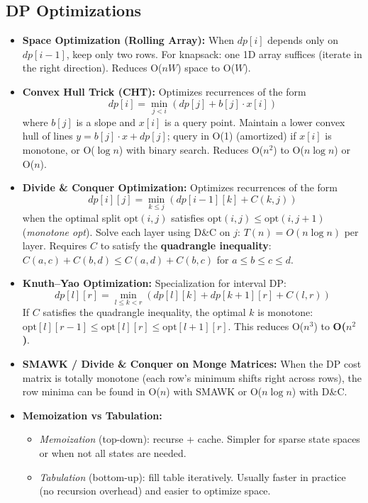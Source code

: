 \subsection{DP Optimizations}

\begin{itemize}
    \item \textbf{Space Optimization (Rolling Array):} When $dp[i]$ depends only on $dp[i-1]$, keep only two rows. For knapsack: one 1D array suffices (iterate in the right direction). Reduces O($nW$) space to O($W$).

    \item \textbf{Convex Hull Trick (CHT):} Optimizes recurrences of the form
          \[ dp[i] = \min_{j < i}\!\left(dp[j] + b[j] \cdot x[i]\right) \]
          where $b[j]$ is a slope and $x[i]$ is a query point. Maintain a lower convex hull of lines $y = b[j] \cdot x + dp[j]$; query in O(1) (amortized) if $x[i]$ is monotone, or O($\log n$) with binary search. Reduces O($n^2$) to O($n \log n$) or O($n$).

    \item \textbf{Divide \& Conquer Optimization:} Optimizes recurrences of the form
          \[ dp[i][j] = \min_{k \leq j}\!\left(dp[i-1][k] + C(k, j)\right) \]
          when the optimal split $\text{opt}(i, j)$ satisfies $\text{opt}(i, j) \leq \text{opt}(i, j+1)$ (\textit{monotone opt}). Solve each layer using D\&C on $j$: $T(n) = O(n \log n)$ per layer. Requires $C$ to satisfy the \textbf{quadrangle inequality}: $C(a,c)+C(b,d) \leq C(a,d)+C(b,c)$ for $a \leq b \leq c \leq d$.

    \item \textbf{Knuth–Yao Optimization:} Specialization for interval DP:
          \[ dp[l][r] = \min_{l \leq k < r}\!\left(dp[l][k] + dp[k+1][r] + C(l,r)\right) \]
          If $C$ satisfies the quadrangle inequality, the optimal $k$ is monotone: $\text{opt}[l][r-1] \leq \text{opt}[l][r] \leq \text{opt}[l+1][r]$. This reduces O($n^3$) to \textbf{O($n^2$)}.

    \item \textbf{SMAWK / Divide \& Conquer on Monge Matrices:} When the DP cost matrix is totally monotone (each row's minimum shifts right across rows), the row minima can be found in O($n$) with SMAWK or O($n \log n$) with D\&C.

    \item \textbf{Memoization vs Tabulation:}
          \begin{itemize}
              \item \textit{Memoization} (top-down): recurse + cache. Simpler for sparse state spaces or when not all states are needed.
              \item \textit{Tabulation} (bottom-up): fill table iteratively. Usually faster in practice (no recursion overhead) and easier to optimize space.
          \end{itemize}
\end{itemize}